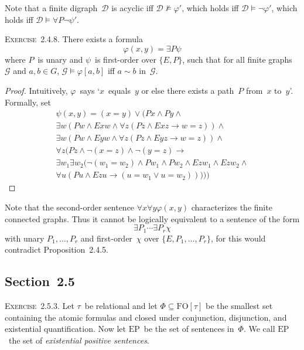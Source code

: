 \documentclass[letterpaper]{article}
\newcommand{\D}{\mathcal{D}}
\newcommand{\G}{\mathcal{G}}
\newcommand{\fo}{\mathrm{FO}}
\newcommand{\ep}{\mathrm{EP}}
\newcommand{\limp}{\rightarrow}
\newcommand{\con}{\sim}
\newcommand{\booksection}[1]{\subsection*{Section~{#1}}}
\newcommand{\exercise}[1]{\noindent\textsc{Exercise~{#1}.}}
\theoremstyle{plain}
\begin{document}
Note that a finite digraph~$\D$ is acyclic iff $\D\not\models\varphi'$, which holds iff $\D\models\lnot\varphi'$, which holds iff $\D\models\forall P\lnot\psi'$.

\bigskip
\exercise{2.4.8}
There exists a formula
$$\varphi(x,y)=\exists P\psi$$
where $P$~is unary and $\psi$~is first-order over $\{E,P\}$, such that for all finite graphs~$\G$ and $a,b\in G$, $\G\models\varphi[a,b]$ iff $a\con b$ in~$\G$.
\begin{proof}
Intuitively, $\varphi$~says `$x$~equals~$y$ or else there exists a path~$P$ from~$x$ to~$y$'. Formally, set
\begin{multline*}
\psi(x,y)=(x=y)\lor(Px\land Py\land\\
	\exists w(Pw\land Exw\land\forall z(Pz\land Exz\limp w=z))\land\\
	\exists w(Pw\land Eyw\land\forall z(Pz\land Eyz\limp w=z))\land\\
	\forall z(Pz\land\lnot(x=z)\land\lnot(y=z)\limp\\
		\exists w_1\exists w_2(\lnot(w_1=w_2)\land Pw_1\land Pw_2\land Ezw_1\land Ezw_2\land\\
			\forall u(Pu\land Ezu\limp(u=w_1\lor u=w_2)))))
\end{multline*}
\end{proof}

Note that the second-order sentence $\forall x\forall y\varphi(x,y)$ characterizes the finite connected graphs. Thus it cannot be logically equivalent to a sentence of the form
$$\exists P_1\cdots\exists P_r\chi$$
with unary $P_1,\ldots,P_r$ and first-order~$\chi$ over $\{E,P_1,\ldots,P_r\}$, for this would contradict Proposition~2.4.5.

\booksection{2.5}
\exercise{2.5.3}
Let $\tau$~be relational and let $\Phi\subseteq\fo[\tau]$ be the smallest set containing the atomic formulas and closed under conjunction, disjunction, and existential quantification. Now let $\ep$~be the set of sentences in~$\Phi$. We call $\ep$~the set of \emph{existential positive sentences}.
\end{document}
